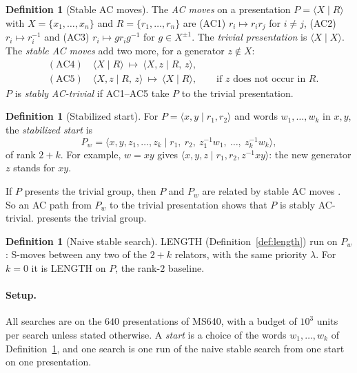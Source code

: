 \documentclass[11pt]{article}
\theoremstyle{definition}
\newtheorem{definition}[theorem]{Definition}
\theoremstyle{remark}
\newcommand{\pres}[2]{\langle #1 \mid #2 \rangle}
\begin{document}
\begin{definition}[Stable AC moves]\label{def:stableac}
The \emph{AC moves} on a presentation $P=\pres{X}{R}$ with $X=\{x_1,\dots,x_n\}$ and $R=\{r_1,\dots,r_n\}$ are (AC1) $r_i\mapsto r_ir_j$ for $i\neq j$, (AC2) $r_i\mapsto
r_i^{-1}$ and (AC3) $r_i\mapsto gr_ig^{-1}$ for $g\in X^{\pm1}$. The \emph{trivial presentation} is $\pres{X}{X}$.
The \emph{stable AC moves} add two more, for a generator $z\notin X$:
\begin{align*}
&(\mathrm{AC4})\quad \pres{X}{R}\ \longmapsto\ \pres{X,z}{R,\,z},\\
&(\mathrm{AC5})\quad \pres{X,z}{R,\,z}\ \longmapsto\ \pres{X}{R},\qquad\text{if $z$ does not occur in $R$}.
\end{align*}
$P$ is \emph{stably AC-trivial} if AC1--AC5 take $P$ to the trivial presentation.
\end{definition}

\begin{definition}[Stabilized start]\label{def:stab}
For $P=\pres{x,y}{r_1,r_2}$ and words $w_1,\dots,w_k$ in $x,y$, the \emph{stabilized start} is
\[
P_w=\pres{x,y,z_1,\dots,z_k}{r_1,\ r_2,\ z_1^{-1}w_1,\ \dots,\ z_k^{-1}w_k},
\]
of rank $2+k$. For example, $w=xy$ gives $\pres{x,y,z}{r_1,r_2,z^{-1}xy}$: the new generator $z$ stands for $xy$.
\end{definition}

If $P$ presents the trivial group, then $P$ and $P_w$ are related by stable AC moves \cite[Lemma~11]{SMM24}. So an
AC path from $P_w$ to the trivial presentation shows that $P$ is stably AC-trivial. 
presents the trivial group.

\begin{definition}[Naive stable search]\label{def:naive}
LENGTH (Definition~\ref{def:length}) run on $P_w$: S-moves between any two of the $2+k$ relators, with the same
priority $\lambda$. For $k=0$ it is LENGTH on $P$, the rank-$2$ baseline.
\end{definition}

\paragraph{Setup.} All searches are on the $640$ presentations of MS640, with a budget of $10^3$ units per search
unless stated otherwise. A \emph{start} is a choice of the words $w_1,\dots,w_k$ of Definition~\ref{def:stab}, and one search is one run of the naive stable search from one start on one presentation.
\end{document}
